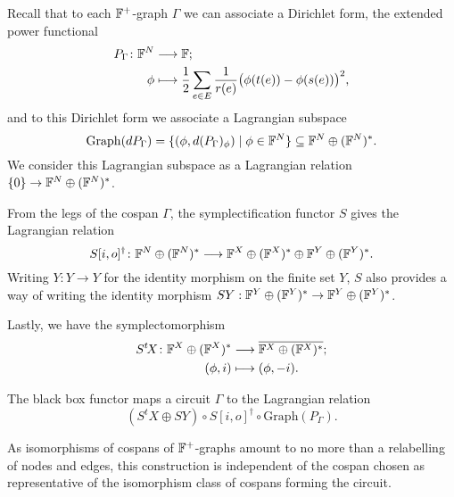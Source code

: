 Recall that to each ${\mathbb F}^+$-graph $\Gamma$ we can associate a Dirichlet form, 
the extended power functional 
\begin{align*}
  P_\Gamma{\colon} {\mathbb F}^N &\longrightarrow {\mathbb F}; \\
  \phi &\longmapsto \frac{1}{2} \sum_{e \in E} \frac{1}{r(e)} \big( \phi(t(e)) -
  \phi(s(e))  \big)^2,
\end{align*}
and to this Dirichlet form we associate a Lagrangian subspace 
\[
  \mathrm{Graph}(dP_\Gamma) = \{(\phi,d(P_\Gamma)_\phi) \mid \phi \in {\mathbb F}^N\}
  \subseteq {\mathbb F}^N \oplus ({\mathbb F}^N)^\ast.
\]
We consider this Lagrangian subspace as a Lagrangian relation $\{0\} \to {\mathbb F}^N
\oplus ({\mathbb F}^N)^\ast$.

From the legs of the cospan $\Gamma$, the symplectification functor $S$ gives the
Lagrangian relation
\[
  S[i,o]^\dagger{\colon} {\mathbb F}^N \oplus ({\mathbb F}^N)^\ast \longrightarrow {\mathbb F}^X \oplus
  ({\mathbb F}^X)^\ast \oplus {\mathbb F}^Y \oplus ({\mathbb F}^Y)^\ast.
\]
Writing $Y: Y \to Y$ for the identity morphism on the finite set $Y$, $S$ also
provides a way of writing the identity morphism $SY: {\mathbb F}^Y \oplus ({\mathbb F}^Y)^\ast \to
{\mathbb F}^Y \oplus ({\mathbb F}^Y)^\ast$. 

Lastly, we have the symplectomorphism
\begin{align*}
  S^t\!X{\colon} {\mathbb F}^X \oplus ({\mathbb F}^X)^\ast &\longrightarrow \overline{{\mathbb F}^X \oplus
  ({\mathbb F}^X)^\ast}; \\
  (\phi,i) &\longmapsto (\phi,-i).
\end{align*}

The black box functor maps a circuit $\Gamma$ to the Lagrangian relation
\[
  (S^t\!X\oplus SY) \circ S[i,o]^\dagger \circ \mathrm{Graph}(P_\Gamma).
\]

As isomorphisms of cospans of ${\mathbb F}^+$-graphs amount to no more than a 
relabelling of nodes and edges, this construction is independent of the cospan 
chosen as representative of the isomorphism class of cospans forming the 
circuit.

